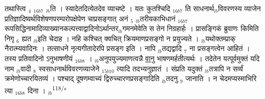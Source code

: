 \documentclass[article,12pt,a4paper]{memoir}%
\newcounter{parCount}
\begin{document}
{\color{DodgerBlue3}तथास्त्वि {\tiny $_{4}$} {\tiny $_{16b7}$} {\tiny $_{lb}$}ति} । स्यादेतदित्येतदेव व्याचष्टे । {\color{DodgerBlue3}यतः कुतश्चिदि {\tiny $_{16b7}$} ति} साधनार्थ{\tiny $_{lb}$}विवरणस्य व्याजेन प्रतिज्ञादिष्वर्थविशेषणपरम्परोपक्षेपेण चाप्रसङ्गात् अनं {\tiny $_{5}$} {\tiny $_{lb}$}तरीयकाभिधानं {\tiny $_{16b7}$} रूपसिद्धिनामादिव्याख्यानकल्पत्त्वाद्वादिनोऽर्थान्तर{\tiny $_{lb}$}गमनमेवेति स तेन निग्रहार्हः । प्रासङ्गिकं ब्रुवाणः किमिति निगृ {\tiny $_{6}$} ह्यत {\tiny $_{lb}$}इति चेदाह । नहि कश्चित् क्वचित् क्रियमाणप्रसङ्गो न प्रयुज्यते । {\tiny $_{lb}$}यथोक्तम्प्राक् नैरात्म्यवादिनः । तत्साधने नृत्यगीतादेरपि प्रसङ्ग इति । नापि {\tiny $_{lb}$}तद्यद्वादि {\tiny $_{7}$} ना प्रसङ्गत्वेन आहितं । तस्य प्रतिवादिनो ऽनुभाषणीयं {\tiny $_{16b8}$} । {\tiny $_{lb}$}अनुपयुज्यमाणत्वन्नै \uline{वानु} भाषणमर्हतीत्यर्थः । तदेतेन यत्पूर्वमुक्तं {\color{DodgerBlue3}यदि नाम {\tiny $_{lb}$}वादी {\tiny $_{8}$} स्वसाधनार्थविवरणव्याजेने} {\tiny $_{15b10}$} त्यादि तदभ्यनुज्ञातं । संप्रति यदुक्तं {\tiny $_{lb}$}तत्रापि न सर्व्वं क्रमेणोच्चारयितव्यं । पश्चाद् दूषणम्वाच्यं द्विरुच्चारणप्रसङ्गादिति {\tiny $_{lb}$}तदनु {\tiny $_{9}$}\leavevmode{} जानाति । {\color{DodgerBlue3}न चेदमप्यस्माभिरि} त्या {\tiny $_{16b8}$} दिना ।
	{}
	\pend%
      {\tiny $_{lb}$}\textsuperscript{\textenglish{118/s}}
\end{document}
